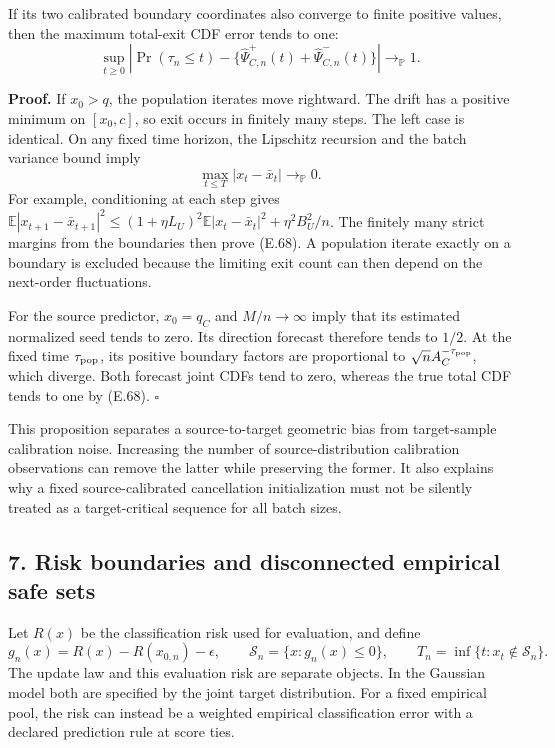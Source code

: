 If its two calibrated boundary coordinates also converge to finite
positive values, then the maximum total-exit CDF error tends to one: \[
\sup_{t\ge0}\left|
\Pr(\tau_n\le t)
-\{\widehat\Psi_{C,n}^+(t)+\widehat\Psi_{C,n}^-(t)\}
\right|\to_{\mathbb P}1.
\tag{E.69}
\]

\textbf{Proof.} If \(x_0>q\), the population iterates move rightward.
The drift has a positive minimum on \([x_0,c]\), so exit occurs in
finitely many steps. The left case is identical. On any fixed time
horizon, the Lipschitz recursion and the batch variance bound imply \[
\max_{t\le T}|x_t-\bar x_t|\to_{\mathbb P}0.
\] For example, conditioning at each step gives
\(\mathbb E|x_{t+1}-\bar x_{t+1}|^2
\le(1+\eta L_U)^2\mathbb E|x_t-\bar x_t|^2+\eta^2B_U^2/n\). The finitely
many strict margins from the boundaries then prove (E.68). A population
iterate exactly on a boundary is excluded because the limiting exit
count can then depend on the next-order fluctuations.

For the source predictor, \(x_0=q_C\) and \(M/n\to\infty\) imply that
its estimated normalized seed tends to zero. Its direction forecast
therefore tends to \(1/2\). At the fixed time \(\tau_{\rm pop}\), its
positive boundary factors are proportional to
\(\sqrt n A_C^{-\tau_{\rm pop}}\), which diverge. Both forecast joint
CDFs tend to zero, whereas the true total CDF tends to one by (E.68).
\(\square\)

This proposition separates a source-to-target geometric bias from
target-sample calibration noise. Increasing the number of
source-distribution calibration observations can remove the latter while
preserving the former. It also explains why a fixed source-calibrated
cancellation initialization must not be silently treated as a
target-critical sequence for all batch sizes.

\subsection{7. Risk boundaries and disconnected empirical safe
sets}\label{risk_boundaries-risk-boundaries-and-disconnected-empirical-safe-sets}

Let \(R(x)\) be the classification risk used for evaluation, and define
\[
g_n(x)=R(x)-R(x_{0,n})-\epsilon,\qquad
\mathcal S_n=\{x:g_n(x)\le0\},\qquad
T_n=\inf\{t:x_t\notin\mathcal S_n\}.
\tag{E.70}
\] The update law and this evaluation risk are separate objects. In the
Gaussian model both are specified by the joint target distribution. For
a fixed empirical pool, the risk can instead be a weighted empirical
classification error with a declared prediction rule at score ties.

